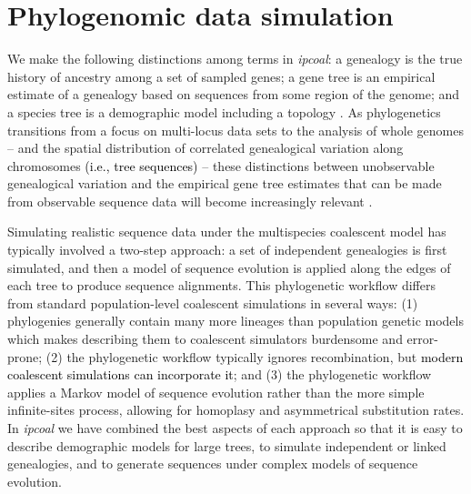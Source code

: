 \documentclass[11pt]{article}
\begin{document}
\section{Phylogenomic data simulation}
We make the following distinctions among terms in \emph{ipcoal}: a genealogy is the true history of ancestry among a set of sampled genes; a gene tree is an empirical estimate of a genealogy based on sequences from some region of the genome; and a species tree is a demographic model including a topology \citep{maddison_gene_1997,pamilo_relationships_1988}. As phylogenetics transitions from a focus on multi-locus data sets \citep{knowles_estimating_2011} to the analysis of whole genomes -- and the spatial distribution of correlated genealogical variation along chromosomes \textcolor{black}{ (i.e., tree sequences)} -- these distinctions 
between unobservable genealogical variation and the empirical gene tree estimates that can be made from observable sequence data
will become increasingly relevant \citep{adams_binning_2019,posada_recombination_2002}. 


Simulating realistic sequence data under the multispecies coalescent model has typically involved a two-step approach: a set of independent genealogies is first simulated, and then a model of sequence evolution is applied along the edges of each tree to produce sequence alignments. This phylogenetic workflow differs from standard population-level coalescent simulations in several ways: (1) phylogenies generally contain many more lineages than population genetic models which makes describing them to coalescent simulators burdensome and error-prone; (2) the phylogenetic workflow typically ignores recombination, but 
\textcolor{black}{modern coalescent simulations can incorporate it}; and (3) the phylogenetic workflow applies a Markov model of sequence evolution rather than the more simple infinite-sites process, allowing for homoplasy and asymmetrical substitution rates. In \emph{ipcoal} we have combined the best aspects of each approach so that it is easy to describe demographic models for large trees, to simulate independent or linked genealogies, and to generate sequences under complex models of sequence evolution. 
\end{document}
